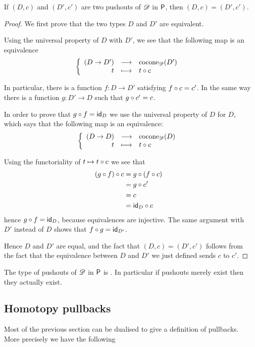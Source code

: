 \begin{lem}
  If $(D,c)$ and $(D',c')$ are two pushouts of $\Ddiag$ in $\P$, then
  $(D,c)=(D',c')$.
\end{lem}
\begin{proof}
  We first prove that the two types $D$ and $D'$ are equivalent.

  Using the universal property of $D$ with $D'$, we see that the following map is an
  equivalence
  \[\function{(D\to{}D')}{\cocone{\Ddiag}{D'}}{t}{\composecocone{t}c}\]

  In particular, there is a function $f:D\to{}D'$ satisfying $\composecocone{f}c=c'$. In the
  same way there is a function $g:D'\to{}D$ such that $\composecocone{g}c'=c$.

  In order to prove that $g\circ{}f=\idfunc[D]$ we use the universal property of
  $D$ for $D$, which says that the following map is an equivalence:
  \[\function{(D\to{}D)}{\cocone{\Ddiag}{D}}{t}{\composecocone{t}c}\]

  Using the functoriality of $t\mapsto{}\composecocone{t}c$ we see that
  \begin{align*}
    \composecocone{(g\circ{}f)}c &= \composecocone{g}(\composecocone{f}c) \\
    &= \composecocone{g}c' \\
    &= c \\
    &= \composecocone{\idfunc[D]}c
  \end{align*}
  hence
  $g\circ{}f=\idfunc[D]$, because equivalences are injective. The same argument
  with $D'$ instead of $D$ shows that $f\circ{}g=\idfunc[D']$.

  Hence $D$ and $D'$ are equal, and the fact that $(D,c)=(D',c')$ follows from
  the fact that the equivalence between $D$ and $D'$ we just defined sends $c$
  to $c'$.
\end{proof}

\begin{cor}
  The type of pushouts of $\Ddiag$ in $\P$ is \anhprop. In particular if
  pushouts merely exist then they actually exist.
\end{cor}


\subsection{Homotopy pullbacks}
\label{sec:pullbacks}

Most of the previous section can be dualised to give a definition of
pullbacks. More precisely we have the following


